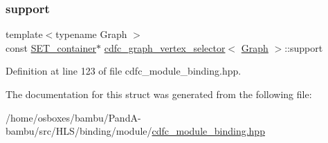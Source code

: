 \subsubsection{\texorpdfstring{support}{support}}
{\footnotesize\ttfamily template$<$typename Graph $>$ \\
const \hyperlink{structcdfc__graph__vertex__selector_a4eabaf16609aadaa7ed6bcb236d82950}{S\+E\+T\+\_\+container}$\ast$ \hyperlink{structcdfc__graph__vertex__selector}{cdfc\+\_\+graph\+\_\+vertex\+\_\+selector}$<$ \hyperlink{structGraph}{Graph} $>$\+::support\hspace{0.3cm}{\ttfamily [private]}}



Definition at line 123 of file cdfc\+\_\+module\+\_\+binding.\+hpp.



The documentation for this struct was generated from the following file\+:\begin{DoxyCompactItemize}
\item 
/home/osboxes/bambu/\+Pand\+A-\/bambu/src/\+H\+L\+S/binding/module/\hyperlink{cdfc__module__binding_8hpp}{cdfc\+\_\+module\+\_\+binding.\+hpp}\end{DoxyCompactItemize}
